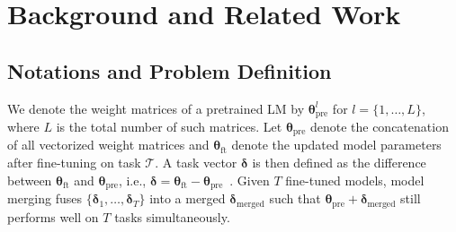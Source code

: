 
\section{Background and Related Work}
\label{sec:background}

\subsection{Notations and Problem Definition}\label{subsec:problem_def}

We denote the weight matrices of a pretrained LM by \(\bm{\theta}_{\text{pre}}^{l}\) for \(l = \{ 1, \ldots, L\} \), where \(L\) is the total number of such matrices. Let $\bm{\theta}_{\text{pre}}$ denote the concatenation of all vectorized weight matrices and $\bm{\theta}_{\text{ft}}$ denote the updated model parameters after fine-tuning on task $\mathcal{T}$. 
A task vector \(\bm{\delta}\) is then defined as the difference between \(\bm{\theta}_{\text{ft}}\) and \(\bm{\theta}_{\text{pre}}\), i.e., \(\bm{\delta} = \bm{\theta}_{\text{ft}} - \bm{\theta}_{\text{pre}}\)~\cite{ilharco2022editing}.
Given $T$ fine-tuned models, model merging fuses $\{\bm{\delta}_1,\ldots,\bm{\delta}_T\}$ into a merged $\bm{\delta}_{\text{merged}}$ such that $\bm{\theta}_{\text{pre}}+\bm{\delta}_{\text{merged}}$ still performs well on $T$ tasks simultaneously.




